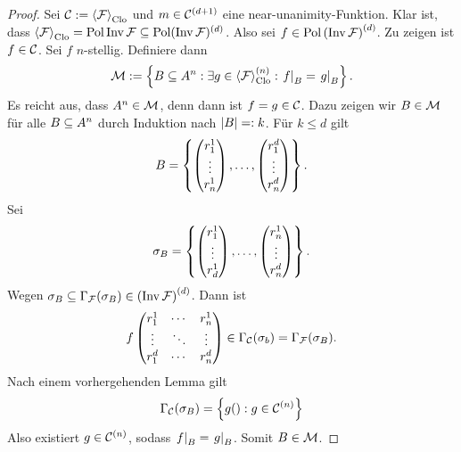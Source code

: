 \documentclass{book}
\begin{document}
\begin{proof}
    Sei $\cC:=\gen{\cF}_{\Clo}$ und $m\in\mathcal{C}^{(d+1)}$ eine near-unanimity-Funktion. Klar ist, dass $\gen{\cF}_{\Clo}=\Pol\Inv\cF\setleq\Pol(\Inv\cF)^{(d)}$. Also sei $f\in\mathop\mathrm{Pol}{(\mathop\mathrm{Inv}\mathcal{F})}^{(d)}$. Zu zeigen ist $f\in \mathcal{C}$. Sei $f$ $n$-stellig. Definiere dann
    $$
    \cM :=\set{B\setleq A^n:\exists g\in\gen{\cF}_{\Clo}^{(n)}:\rest{f}_{B}=\rest{g}_{B}}.
    $$
    Es reicht aus, dass $A^n\in\mathcal{M}$, denn dann ist $f=g\in\mathcal{C}$. Dazu zeigen wir $B\in\mathcal{M}$ für alle $B\subseteq A^n$ durch Induktion nach $\left|B\right|=:k$.
    Für $k\leq d$ gilt
    $$
    B = \left\{
        \begin{pmatrix}
            r_1^1\\
            \vdots\\
            r_n^1
        \end{pmatrix},\ldots,
        \begin{pmatrix}
            r_1^d\\
            \vdots\\
            r_n^d
        \end{pmatrix}
\right\}.
$$
Sei
$$
\sigma_B = \left\{        \begin{pmatrix}
            r_1^1\\
            \vdots\\
            r_d^1
        \end{pmatrix},\ldots,
        \begin{pmatrix}
            r_n^1\\
            \vdots\\
            r_n^d
        \end{pmatrix}
\right\}.
$$
Wegen $\sigma_B\subseteq\Gamma_{\mathcal{F}}(\sigma_B)\in{(\mathop\mathrm{Inv}\mathcal{F})}^{(d)}$. Dann ist
$$
f
\begin{pmatrix}
    r_1^1 & \cdots & r_n^1\\
    \vdots & \ddots & \vdots\\
    r_1^d & \cdots & r_n^d
\end{pmatrix}
\in\Gamma_{\mathcal{C}}(\sigma_b)=\Gamma_{\mathcal{F}}(\sigma_B).
$$
Nach einem vorhergehenden Lemma gilt
$$
\Gamma_{\mathcal{C}}(\sigma_B)=\left\{g():g\in \mathcal{C}^{(n)}\right\}
$$
Also existiert $g\in\mathcal{C}^{(n)}$, sodass $\left. f\right\vert_B=\left. g\right\vert_B$. Somit $B\in\mathcal{M}$.


\end{proof}
\end{document}
